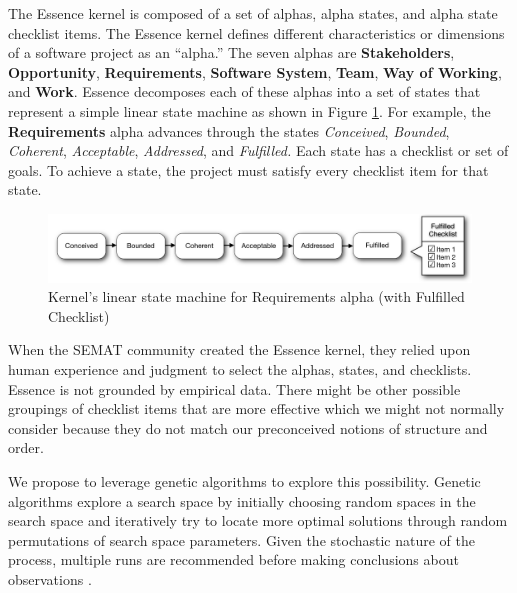 \documentclass[3p,times,procedia]{elsarticle}
\begin{document}
The Essence kernel is composed of a set of alphas, alpha states, and alpha state checklist items. The Essence kernel defines different characteristics or dimensions of a software project as an ``alpha.'' The seven alphas are \textbf{Stakeholders}, \textbf{Opportunity}, \textbf{Requirements}, \textbf{Software System}, \textbf{Team}, \textbf{Way of Working}, and \textbf{Work}. Essence decomposes each of these alphas into a set of states that represent a simple linear state machine as shown in Figure \ref{StateMachine}. For example, the \textbf{Requirements} alpha advances through the states \textit{Conceived}, \textit{Bounded}, \textit{Coherent}, \textit{Acceptable}, \textit{Addressed}, and \textit{Fulfilled.} Each state has a checklist or set of goals. To achieve a state, the project must satisfy every checklist item for that state. \cite{OMGStandard} 
 
\begin{figure}[h]\vspace*{4pt}
\centerline{\includegraphics[width=5.4in]{kernel_images/StateMachineRequirements}}
\caption{Kernel's linear state machine for Requirements alpha (with Fulfilled Checklist)}\vspace*{-6pt}\label{StateMachine}
\end{figure}

When the SEMAT community created the Essence kernel, they relied upon human experience and judgment to select the alphas, states, and checklists. Essence is not grounded by empirical data. There might be other possible groupings of checklist items that are more effective which we might not normally consider because they do not match our preconceived notions of structure and order.

We propose to leverage genetic algorithms to explore this possibility. Genetic algorithms explore a search space by initially choosing random spaces in the search space and iteratively try to locate more optimal solutions through random permutations of search space parameters. Given the stochastic nature of the process, multiple runs are recommended before making conclusions about observations \cite{Goldberg1989, Holland1992}.
\end{document}
